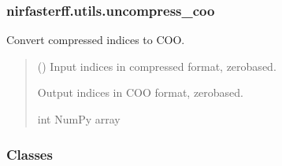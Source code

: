 \documentclass[letterpaper,10pt,english]{sphinxmanual}
\begin{document}
\sphinxstepscope


\subsubsection{nirfasterff.utils.uncompress\_coo}
\label{\detokenize{_autosummary/nirfasterff.utils.uncompress_coo:nirfasterff-utils-uncompress-coo}}\label{\detokenize{_autosummary/nirfasterff.utils.uncompress_coo::doc}}

\begin{fulllineitems}
\label{\detokenize{_autosummary/nirfasterff.utils.uncompress_coo:nirfasterff.utils.uncompress_coo}}
\pysigstartsignatures
{}
\pysigstopsignatures
\sphinxAtStartPar
Convert compressed indices to COO.
\begin{quote}\begin{description}
\sphinxAtStartPar
{} () \textendash{} Input indices in compressed format, zero\sphinxhyphen{}based.

\sphinxAtStartPar
{} \textendash{} Output indices in COO format, zero\sphinxhyphen{}based.

\sphinxAtStartPar
int NumPy array

\end{description}\end{quote}

\end{fulllineitems}

\subsubsection*{Classes}
\end{document}
